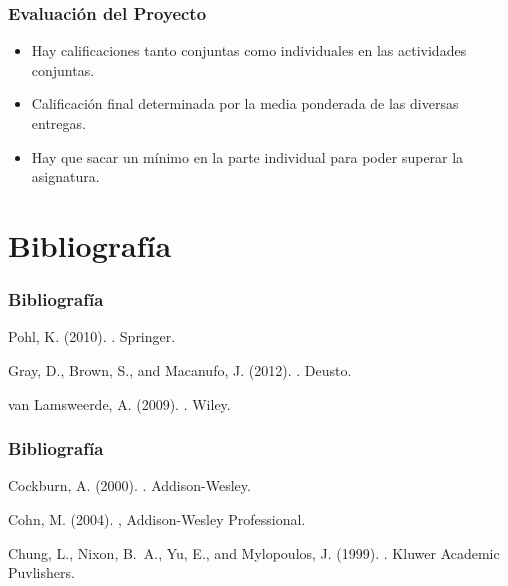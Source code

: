 \documentclass[handout,a4paper,slidestop,xcolor=pst,dvips,blue]{beamer}
\begin{document}
\begin{frame}[c]
	\frametitle{Evaluación del Proyecto}
	\begin{itemize}[<+->]
        \item Hay calificaciones tanto conjuntas como individuales en las actividades conjuntas.
        \item Calificación final determinada por la media ponderada de las diversas entregas.
        \item Hay que sacar un mínimo en la parte individual para poder superar la asignatura. 
	\end{itemize}
\end{frame}

\section{Bibliografía}

\begin{frame}[c]
	\frametitle{Bibliografía}
\begin{thebibliography}{}

Pohl, K. (2010).
.
\newblock Springer.

Gray, D., Brown, S., and Macanufo, J. (2012).
.
\newblock Deusto.

van Lamsweerde, A. (2009).
.
\newblock Wiley.

\end{thebibliography}
\end{frame}

\begin{frame}[c]
	\frametitle{Bibliografía}
\begin{thebibliography}{}

Cockburn, A. (2000).
.
\newblock Addison-Wesley.

Cohn, M. (2004).
,
\newblock Addison-Wesley Professional.

Chung, L., Nixon, B.~A., Yu, E., and Mylopoulos, J. (1999).
.
\newblock Kluwer Academic Puvlishers.

\end{thebibliography}

\end{frame}
\end{document}
